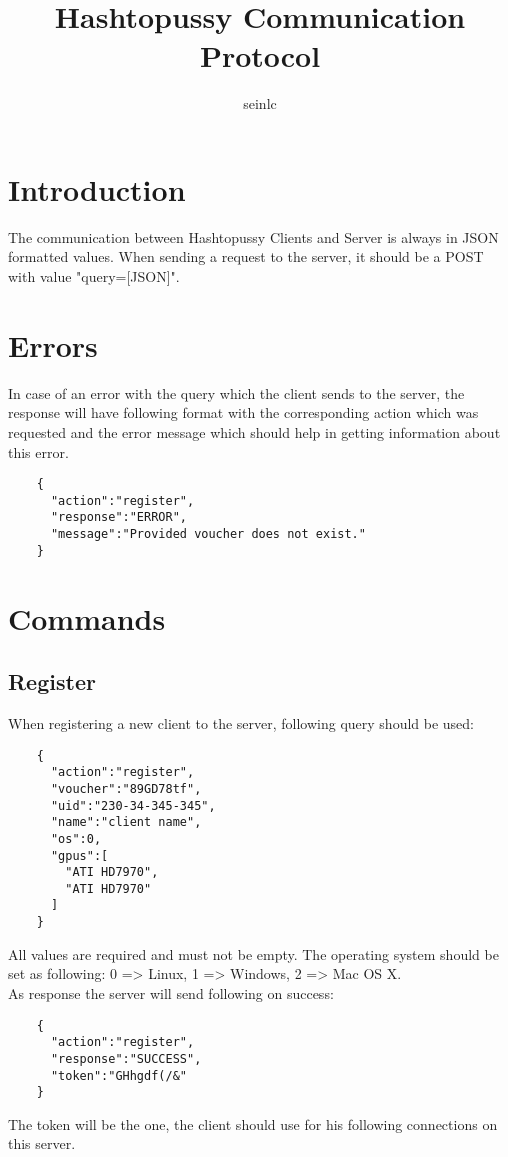 \documentclass{article}
\author{seinlc}
\begin{document}
	\title{Hashtopussy Communication Protocol}
	\maketitle
	\section*{Introduction}
	The communication between Hashtopussy Clients and Server is always in JSON formatted values. When sending a request to the server, it should be a POST with value
	"query=[JSON]".

	\section*{Errors}
	In case of an error with the query which the client sends to the server, the response will have following format with the corresponding action which was requested and the error message which should help in getting information about this error.
	\begin{verbatim}
	{
	  "action":"register",
	  "response":"ERROR",
	  "message":"Provided voucher does not exist."
	}
	\end{verbatim}
	\pagebreak
	\section*{Commands}

	\subsection*{Register}
	When registering a new client to the server, following query should be used:
	\begin{verbatim}
	{
	  "action":"register",
	  "voucher":"89GD78tf",
	  "uid":"230-34-345-345",
	  "name":"client name",
	  "os":0,
	  "gpus":[
	    "ATI HD7970",
	    "ATI HD7970"
	  ]
	}
	\end{verbatim}
	All values are required and must not be empty. The operating system should be set as following: 0 => Linux, 1 => Windows, 2 => Mac OS X.\\
	As response the server will send following on success:
	\begin{verbatim}
	{
	  "action":"register",
	  "response":"SUCCESS",
	  "token":"GHhgdf(/&"
	} 
	\end{verbatim}
	The token will be the one, the client should use for his following connections on this server.
	
\end{document}
